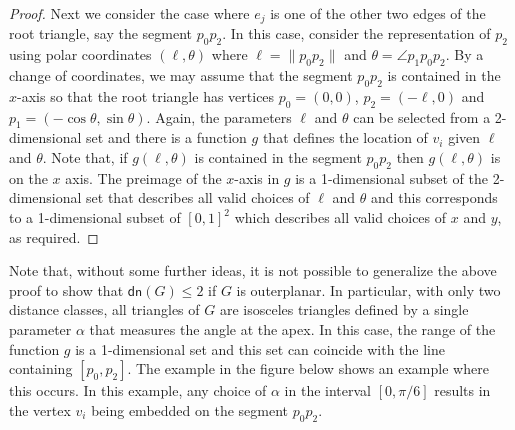 \documentclass{article}
\newcommand{\dn}{\mathsf{dn}}
\begin{document}
\begin{proof}
Next we consider the case where $e_j$ is one of the other two edges of
the root triangle, say the segment $p_0p_2$.  In this case,
consider the representation of $p_2$ using polar coordinates
$(\ell,\theta)$ where $\ell=\|p_0p_2\|$ and $\theta=\angle p_1p_0p_2$.
By a change of coordinates, we may assume that the segment $p_0p_2$
is contained in the $x$-axis so that the root triangle has vertices
$p_0=(0,0)$, $p_2=(-\ell,0)$ and $p_1=(-\cos\theta,\sin\theta)$.
Again, the parameters $\ell$ and $\theta$ can be selected from a
2-dimensional set and there is a function $g$ that defines the
location of $v_i$ given $\ell$ and $\theta$.  Note that, if
$g(\ell,\theta)$ is contained in the segment $p_0p_2$ then
$g(\ell,\theta)$ is on the $x$ axis.  The preimage of the $x$-axis in
$g$ is a 1-dimensional subset of the 2-dimensional set that describes
all valid choices of $\ell$ and $\theta$ and this 
corresponds to a 1-dimensional subset of $[0,1]^2$ which describes all
valid choices of $x$ and $y$, as required.
\end{proof}

Note that, without some further ideas, it is not possible to
generalize the above proof to show that $\dn(G)\le 2$ if $G$ is
outerplanar.  In particular, with only two distance classes, all
triangles of $G$ are isosceles triangles defined by a single parameter
$\alpha$ that measures the angle at the apex.  In this case, the range
of the function $g$ is a 1-dimensional set and this set can coincide
with the line containing $[p_0,p_2]$.  The example in the figure below
shows an example where this occurs.  In this example, any choice
of $\alpha$ in the interval $[0,\pi/6]$ results in the vertex $v_i$ being
embedded on the segment $p_0p_2$.
\end{document}
